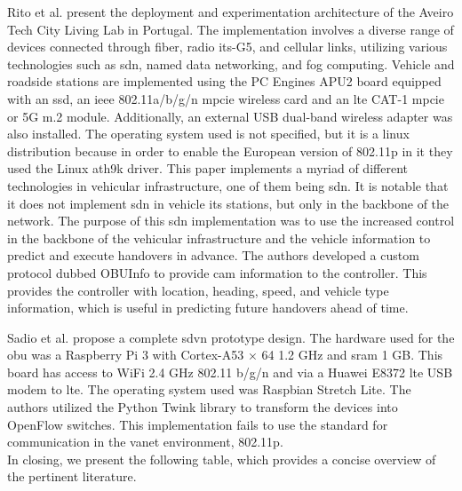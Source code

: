     
    Rito et al.\cite{rito_aveiro_2023} present the deployment and experimentation architecture of the Aveiro Tech City Living Lab in Portugal. The implementation involves a diverse range of devices connected through fiber, radio \gls{its}-G5, and cellular links, utilizing various technologies such as \gls{sdn}, named data networking, and fog computing.
    Vehicle and roadside stations are implemented using the PC Engines APU2 board equipped with an \gls{ssd}, an \gls{ieee} 802.11a/b/g/n \gls{mpcie} wireless card and an \gls{lte} CAT-1 \gls{mpcie} or 5G m.2 module. Additionally, an external USB dual-band wireless adapter was also installed. The operating system used is not specified, but it is a linux distribution because in order to enable the European version of 802.11p in it they used the Linux ath9k driver.
    This paper implements a myriad of different technologies in vehicular infrastructure, one of them being \gls{sdn}. It is notable that it does not implement \gls{sdn} in vehicle \gls{its} stations, but only in the backbone of the network. The purpose of this \gls{sdn} implementation was to use the increased control in the backbone of the vehicular infrastructure and the vehicle information to predict and execute handovers in advance. The authors developed a custom protocol dubbed OBUInfo to provide \gls{cam} information to the controller. This provides the controller with location, heading, speed, and vehicle type information, which is useful in predicting future handovers ahead of time.
    
    
    Sadio et al.\cite{sadio_design_2020} propose a complete \gls{sdvn} prototype design. The hardware used for the \gls{obu} was a Raspberry Pi 3 with Cortex-A53 × 64 1.2 GHz and \gls{sram} 1 GB. This board has access to WiFi 2.4 GHz 802.11 b/g/n and via a Huawei E8372 \gls{lte} USB modem to \gls{lte}. The operating system used was Raspbian Stretch Lite. The authors utilized the Python Twink library to transform the devices into OpenFlow switches. This implementation fails to use the standard for communication in the \gls{vanet} environment, 802.11p.
    \\
    In closing, we present the following table, which provides a concise overview of the pertinent literature.

